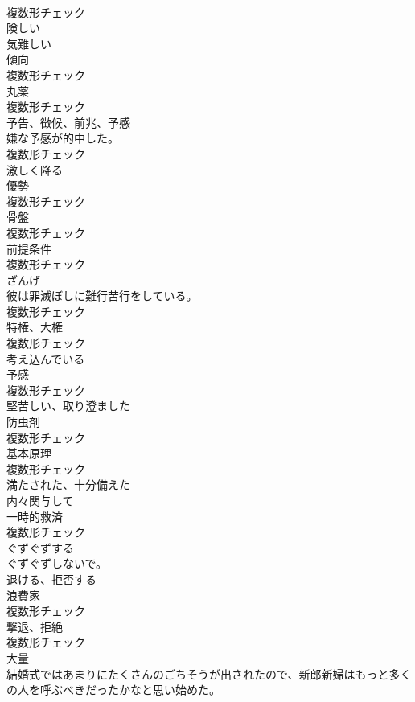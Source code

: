 \documentclass[8pt]{extreport}
\begin{document}
\begin{CJK}{UTF8}{min}
\\	複数形チェック
\\	[形容詞]	険しい	
\\	[形容詞]	気難しい	
\\	[名詞]	傾向	
\\	複数形チェック
\\	[名詞]	丸薬	
\\	複数形チェック
\\	[名詞]	予告、徴候、前兆、予感	
\\	嫌な予感が的中した。	
\\	複数形チェック
\\	[動詞]	激しく降る	
\\	[名詞]	優勢	
\\	複数形チェック
\\	[名詞]	骨盤	
\\	複数形チェック
\\	[名詞]	前提条件	
\\	複数形チェック
\\	[名詞]	ざんげ	
\\	彼は罪滅ぼしに難行苦行をしている。	
\\	複数形チェック
\\	[名詞]	特権、大権	
\\	複数形チェック
\\	[形容詞]	考え込んでいる	
\\	[名詞]	予感	
\\	複数形チェック
\\	[形容詞]	堅苦しい、取り澄ました	
\\	[名詞]	防虫剤	
\\	複数形チェック
\\	[名詞]	基本原理	
\\	複数形チェック
\\	[形容詞]	満たされた、十分備えた	
\\	[形容詞]	内々関与して	
\\	[名詞]	一時的救済	
\\	複数形チェック
\\	[動詞]	ぐずぐずする	
\\	ぐずぐずしないで。	
\\	[動詞]	退ける、拒否する	
\\	[名詞]	浪費家	
\\	複数形チェック
\\	[名詞]	撃退、拒絶	
\\	複数形チェック
\\	[名詞]	大量	
\\	結婚式ではあまりにたくさんのごちそうが出されたので、新郎新婦はもっと多くの人を呼ぶべきだったかなと思い始めた。	

\end{CJK}
\end{document}
